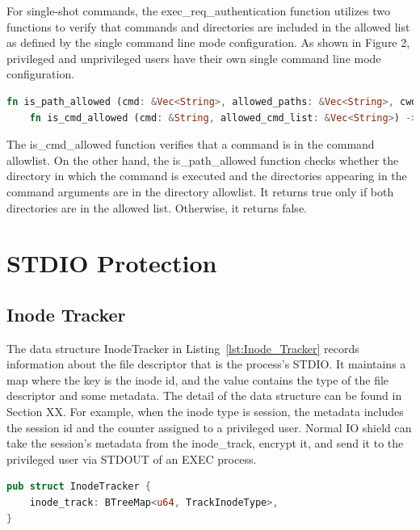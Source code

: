 For single-shot commands, the exec\_req\_authentication function utilizes two functions to verify that commands and directories are included in the allowed list as defined by the single command line mode configuration. As shown in Figure 2, privileged and unprivileged users have their own single 
command line mode configuration.


\begin{lstlisting}[language=rust, caption= API of EXEC checker, label={lst:exec_Cheker_sighlr}]
    fn is_path_allowed (cmd: &Vec<String>, allowed_paths: &Vec<String>, cwd: &str) -> bool
    fn is_cmd_allowed (cmd: &String, allowed_cmd_list: &Vec<String>) ->bool 
\end{lstlisting}
    

The is\_cmd\_allowed function verifies that a command is in the command allowlist. On the other hand, the is\_path\_allowed function checks whether the directory in which the command is executed and the directories appearing in the command arguments are in the directory allowlist. It returns true 
only if both directories are in the allowed list. Otherwise, it returns false.



\section{STDIO Protection}

\subsection{Inode Tracker}
The data structure InodeTracker in Listing~\ref*{lst:Inode_Tracker} records information about the file descriptor that is the process’s STDIO. It maintains a map where the key is the inode id, and the value contains the type of the file descriptor and some metadata. 
The detail of the data structure can be found in Section XX. For example, when the inode type is session, the metadata includes the session id and the counter assigned to a privileged user. Normal IO shield can take the session's metadata from the inode\_track, encrypt it, and send it to
the privileged user via STDOUT of an EXEC process.
\begin{lstlisting}[language=rust, caption= API of Inode Tracker, label={lst:Inode_Tracker}]
pub struct InodeTracker {
    inode_track: BTreeMap<u64, TrackInodeType>,
} 
\end{lstlisting}

